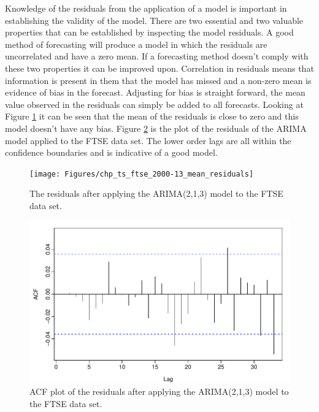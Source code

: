 Knowledge of the residuals from the application of a model is important in establishing the validity of the model. There are two essential and two valuable properties that can be established by inspecting the model residuals. A good method of forecasting will produce a model in which the residuals are uncorrelated and have a zero mean. If a forecasting method doesn't comply with these two properties it can be improved upon. Correlation in residuals means that information is present in them that the model has missed and a non-zero mean is evidence of bias in the forecast. Adjusting for bias is straight forward, the mean value observed in the residuals can simply be added to all forecasts. Looking at Figure \ref{fig:chp_ts_ftse_2000_13_mean_residuals} it can be seen that the mean of the residuals is close to zero and this model doesn't have any bias. Figure \ref{fig:chp_ts_ftse_2000_13_acf_residuals} is the plot of the residuals of the ARIMA model applied to the FTSE data set. The lower order lags are all within the confidence boundaries and is indicative of a good model.

\begin{figure}[!tbh]
\centering
\texttt{[image: Figures/chp\_ts\_ftse\_2000-13\_mean\_residuals]}
\caption[FTSE 100 ARIMA model residuals.]{The residuals after applying the ARIMA(2,1,3) model to the FTSE data set.}
\label{fig:chp_ts_ftse_2000_13_mean_residuals}
\end{figure}

\begin{figure}[!tbh]
\centering
\includegraphics{Figures/chp_ts_ftse_2000-13_acf_residuals}
\caption[ACF plot of the FTSE 100 ARIMA model residuals]{ACF plot of the residuals after applying the ARIMA(2,1,3) model to the FTSE data set.}
\label{fig:chp_ts_ftse_2000_13_acf_residuals}
\end{figure}

